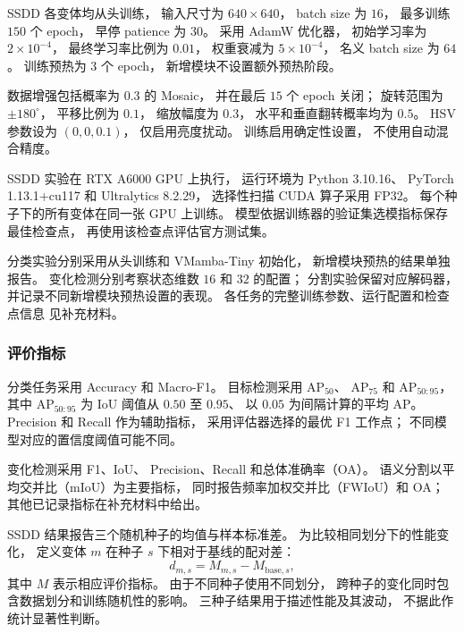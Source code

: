 \documentclass[journal]{IEEEtran}
\begin{document}
SSDD 各变体均从头训练，
输入尺寸为 $640\times640$，
batch size 为 $16$，
最多训练 $150$ 个 epoch，
早停 patience 为 $30$。
采用 AdamW 优化器，
初始学习率为 $2\times10^{-4}$，
最终学习率比例为 $0.01$，
权重衰减为 $5\times10^{-4}$，
名义 batch size 为 $64$。
训练预热为 $3$ 个 epoch，
新增模块不设置额外预热阶段。

数据增强包括概率为 $0.3$ 的 Mosaic，
并在最后 $15$ 个 epoch 关闭；
旋转范围为 $\pm180^\circ$，
平移比例为 $0.1$，
缩放幅度为 $0.3$，
水平和垂直翻转概率均为 $0.5$。
HSV 参数设为 $(0,0,0.1)$，
仅启用亮度扰动。
训练启用确定性设置，
不使用自动混合精度。

SSDD 实验在 RTX A6000 GPU 上执行，
运行环境为 Python 3.10.16、
PyTorch 1.13.1+cu117 和 Ultralytics 8.2.29，
选择性扫描 CUDA 算子采用 FP32。
每个种子下的所有变体在同一张 GPU 上训练。
模型依据训练器的验证集选模指标保存最佳检查点，
再使用该检查点评估官方测试集。

分类实验分别采用从头训练和 VMamba-Tiny 初始化，
新增模块预热的结果单独报告。
变化检测分别考察状态维数 $16$ 和 $32$ 的配置；
分割实验保留对应解码器，
并记录不同新增模块预热设置的表现。
各任务的完整训练参数、运行配置和检查点信息
见补充材料。


\subsubsection{评价指标}
\label{sec:evaluation_metrics}

分类任务采用 Accuracy 和 Macro-F1。
目标检测采用
$\mathrm{AP}_{50}$、
$\mathrm{AP}_{75}$ 和
$\mathrm{AP}_{50:95}$，
其中 $\mathrm{AP}_{50:95}$
为 IoU 阈值从 $0.50$ 至 $0.95$、
以 $0.05$ 为间隔计算的平均 AP。
Precision 和 Recall 作为辅助指标，
采用评估器选择的最优 F1 工作点；
不同模型对应的置信度阈值可能不同。

变化检测采用 F1、IoU、
Precision、Recall 和总体准确率（OA）。
语义分割以平均交并比（mIoU）为主要指标，
同时报告频率加权交并比（FWIoU）和 OA；
其他已记录指标在补充材料中给出。

SSDD 结果报告三个随机种子的均值与样本标准差。
为比较相同划分下的性能变化，
定义变体 $m$ 在种子 $s$ 下相对于基线的配对差：
\begin{equation}
d_{m,s}
=
M_{m,s}-M_{\mathrm{base},s},
\label{eq:paired_difference}
\end{equation}
其中 $M$ 表示相应评价指标。
由于不同种子使用不同划分，
跨种子的变化同时包含数据划分和训练随机性的影响。
三种子结果用于描述性能及其波动，
不据此作统计显著性判断。
\end{document}
